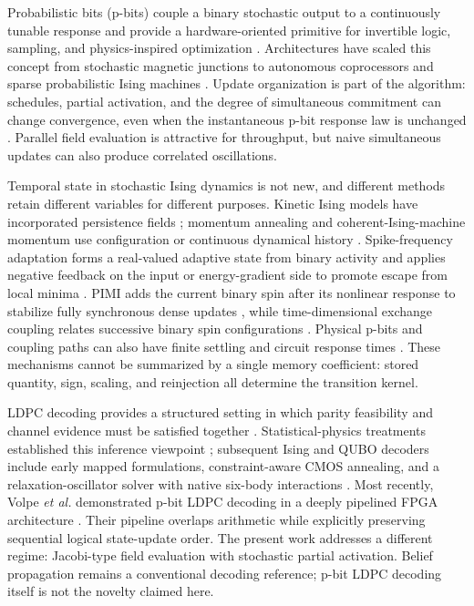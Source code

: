 \documentclass[aps,prapplied,reprint,superscriptaddress,longbibliography,floatfix]{revtex4-2}
\begin{document}
Probabilistic bits (p-bits) couple a binary stochastic output to a continuously tunable response and provide a hardware-oriented primitive for invertible logic, sampling, and physics-inspired optimization \cite{camsari2017prx,faria2017lmag,borders2019nature}.  Architectures have scaled this concept from stochastic magnetic junctions to autonomous coprocessors and sparse probabilistic Ising machines \cite{sutton2020access,aadit2022natureelectronics,chowdhury2023fullstack}.  Update organization is part of the algorithm: schedules, partial activation, and the degree of simultaneous commitment can change convergence, even when the instantaneous p-bit response law is unchanged \cite{onizawa2023ojsp,onizawa2024srep,onizawa2026landscape}.  Parallel field evaluation is attractive for throughput, but naive simultaneous updates can also produce correlated oscillations.

Temporal state in stochastic Ising dynamics is not new, and different methods retain different variables for different purposes.  Kinetic Ising models have incorporated persistence fields \cite{caccioli2008memory}; momentum annealing and coherent-Ising-machine momentum use configuration or continuous dynamical history \cite{okuyama2019momentum,brown2024momentumcim}.  Spike-frequency adaptation forms a real-valued adaptive state from binary activity and applies negative feedback on the input or energy-gradient side to promote escape from local minima \cite{xu2025sfa}.  PIMI adds the current binary spin after its nonlinear response to stabilize fully synchronous dense updates \cite{zhu2026pimi}, while time-dimensional exchange coupling relates successive binary spin configurations \cite{du2026tec}.  Physical p-bits and coupling paths can also have finite settling and circuit response times \cite{mcgoldrick2022settling,gibeault2024coupling}.  These mechanisms cannot be summarized by a single memory coefficient: stored quantity, sign, scaling, and reinjection all determine the transition kernel.

LDPC decoding provides a structured setting in which parity feasibility and channel evidence must be satisfied together \cite{gallager1962ldpc,mackay1996ldpc,richardson2008coding}.  Statistical-physics treatments established this inference viewpoint \cite{saad2001ldpcphysics}; subsequent Ising and QUBO decoders include early mapped formulations, constraint-aware CMOS annealing, and a relaxation-oscillator solver with native six-body interactions \cite{tawada2020ldpc,elmitwalli2025constraint,dikopoulos2025rxoldpc}.  Most recently, Volpe \textit{et al.} demonstrated p-bit LDPC decoding in a deeply pipelined FPGA architecture \cite{volpe2026pipelined}.  Their pipeline overlaps arithmetic while explicitly preserving sequential logical state-update order.  The present work addresses a different regime: Jacobi-type field evaluation with stochastic partial activation.  Belief propagation remains a conventional decoding reference; p-bit LDPC decoding itself is not the novelty claimed here.
\end{document}
